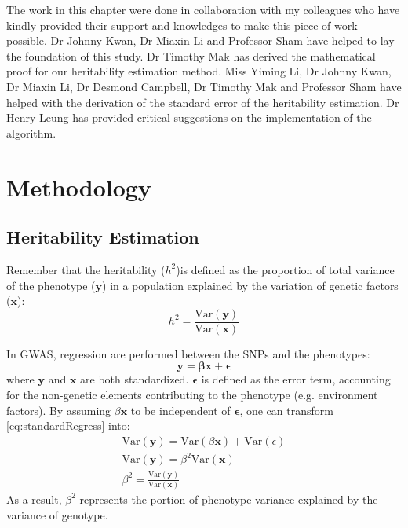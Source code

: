 	The work in this chapter were done in collaboration with my colleagues who have kindly provided their support and knowledges to make this piece of work possible.
	Dr Johnny Kwan, Dr Miaxin Li and Professor Sham have helped to lay the foundation of this study. 
	Dr Timothy Mak has derived the mathematical proof for our heritability estimation method. 
	Miss Yiming Li, Dr Johnny Kwan, Dr Miaxin Li, Dr Desmond Campbell, Dr Timothy Mak and Professor Sham have helped with the derivation of the standard error of the heritability estimation. 
	Dr Henry Leung has provided critical suggestions on the implementation of the algorithm.
	
	\section{Methodology}			
		\subsection{Heritability Estimation}
			Remember that the heritability ($h^2$)is defined as the proportion of total variance of the phenotype ($\boldsymbol{y}$) in a population explained by the variation of genetic factors ($\boldsymbol{x}$):
			$$
				h^2 = \frac{\mathrm{Var}(\boldsymbol{y})}{\mathrm{Var}(\boldsymbol{x})}
			$$
			
			In \gls{GWAS}, regression are performed between the \glspl{SNP} and the phenotypes:
			\begin{equation}
				\boldsymbol{y}=\boldsymbol{\beta x}+\boldsymbol{\epsilon}
				\label{eq:standardRegress}
			\end{equation}
			where $\boldsymbol{y}$ and $\boldsymbol{x}$ are both standardized.
			$\boldsymbol{\epsilon}$ is defined as the error term, accounting for the non-genetic elements contributing to the phenotype (e.g. environment factors).
			By assuming $\beta \boldsymbol{x}$ to be independent of $\boldsymbol{\epsilon}$, one can transform \cref{eq:standardRegress} into:
			\begin{align}
				\mathrm{Var}(\boldsymbol{y}) = \mathrm{Var}(\beta \boldsymbol{x})+ \mathrm{Var}(\epsilon) \nonumber\\
				\mathrm{Var}(\boldsymbol{y}) = \beta^2\mathrm{Var}(\boldsymbol{x}) \nonumber\\
				\beta^2= \frac{\mathrm{Var}(\boldsymbol{y})}{\mathrm{Var}(\boldsymbol{x})}
				\label{eq:betaHeri}
			\end{align}
			As a result, $\beta^2$ represents the portion of phenotype variance explained by the variance of genotype.
					
